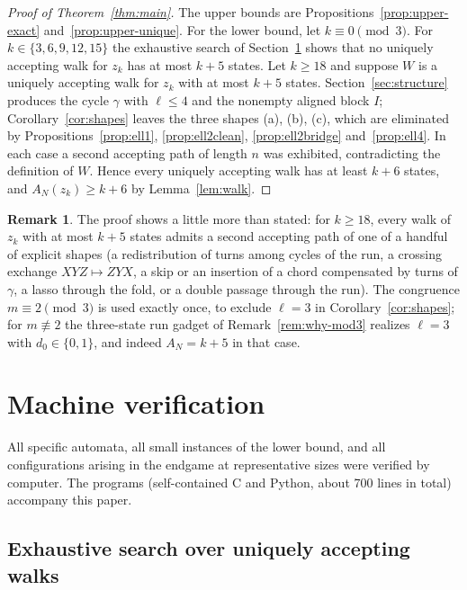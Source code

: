 \documentclass[11pt]{article}
\theoremstyle{definition}
\newtheorem{remark}[theorem]{Remark}
\newcommand{\AN}{A_N}
\begin{document}
\begin{proof}[Proof of Theorem~\ref{thm:main}]
The upper bounds are Propositions~\ref{prop:upper-exact}
and~\ref{prop:upper-unique}. For the lower bound, let $k\equiv0\pmod3$. For
$k\in\{3,6,9,12,15\}$ the exhaustive search of Section~\ref{sec:verification}
shows that no uniquely accepting walk for $z_k$ has at most $k+5$ states. Let
$k\ge18$ and suppose $W$ is a uniquely accepting walk for $z_k$ with at most
$k+5$ states. Section~\ref{sec:structure} produces the cycle $\gamma$ with
$\ell\le4$ and the nonempty aligned block $I$; Corollary~\ref{cor:shapes}
leaves the three shapes (a), (b), (c), which are eliminated by
Propositions~\ref{prop:ell1}, \ref{prop:ell2clean}, \ref{prop:ell2bridge}
and~\ref{prop:ell4}. In each case a second accepting path of length $n$ was
exhibited, contradicting the definition of $W$. Hence every uniquely
accepting walk has at least $k+6$ states, and $\AN(z_k)\ge k+6$ by
Lemma~\ref{lem:walk}.
\end{proof}

\begin{remark}
The proof shows a little more than stated: for $k\ge18$, every walk of
$z_k$ with at most $k+5$ states admits a second accepting path of one of a
handful of explicit shapes (a redistribution of turns among cycles of the
run, a crossing exchange $XYZ\mapsto ZYX$, a skip or an insertion of a chord
compensated by turns of $\gamma$, a lasso through the fold, or a double
passage through the run). The congruence $m\equiv2\pmod3$ is used exactly
once, to exclude $\ell=3$ in Corollary~\ref{cor:shapes}; for $m\not\equiv2$
the three-state run gadget of Remark~\ref{rem:why-mod3} realizes $\ell=3$
with $d_0\in\{0,1\}$, and indeed $\AN=k+5$ in that case.
\end{remark}

\section{Machine verification}\label{sec:verification}

All specific automata, all small instances of the lower bound, and all
configurations arising in the endgame at representative sizes were verified
by computer. The programs (self-contained C and Python, about 700 lines in
total) accompany this paper.

\subsection{Exhaustive search over uniquely accepting walks}
\end{document}
